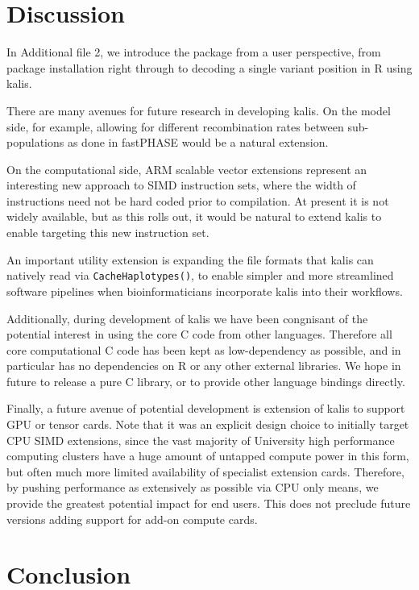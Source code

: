 \documentclass[pdflatex,referee,lineno,sn-nature]{sn-jnl}%
\let\proglang=\textsf
\newcommand{\pkg}[1]{{\fontseries{m}\fontseries{b}\selectfont #1}}
\begin{document}
\section*{Discussion}
\label{sec:thepkg}

In Additional file 2, we introduce the package from a user perspective, from package installation right through to decoding a single variant position in \proglang{R} using \pkg{kalis}.

There are many avenues for future research in developing \pkg{kalis}.
On the model side, for example, allowing for different recombination rates between sub-populations as done in fastPHASE \cite{scheet2006fast} would be a natural extension.

On the computational side, ARM scalable vector extensions \cite{armsve} represent an interesting new approach to SIMD instruction sets, where the width of instructions need not be hard coded prior to compilation.
At present it is not widely available, but as this rolls out, it would be natural to extend \pkg{kalis} to enable targeting this new instruction set.

An important utility extension is expanding the file formats that \pkg{kalis} can natively read via \texttt{CacheHaplotypes()}, to enable simpler and more streamlined software pipelines when bioinformaticians incorporate \pkg{kalis} into their workflows.

Additionally, during development of \pkg{kalis} we have been congnisant of the potential interest in using the core C code from other languages.
Therefore all core computational C code has been kept as low-dependency as possible, and in particular has no dependencies on R or any other external libraries.
We hope in future to release a pure C library, or to provide other language bindings directly.

Finally, a future avenue of potential development is extension of \pkg{kalis} to support GPU or tensor cards.
Note that it was an explicit design choice to initially target CPU SIMD extensions, since the vast majority of University high performance computing clusters have a huge amount of untapped compute power in this form, but often much more limited availability of specialist extension cards.
Therefore, by pushing performance as extensively as possible via CPU only means, we provide the greatest potential impact for end users.
This does not preclude future versions adding support for add-on compute cards.



\section*{Conclusion}
\end{document}

